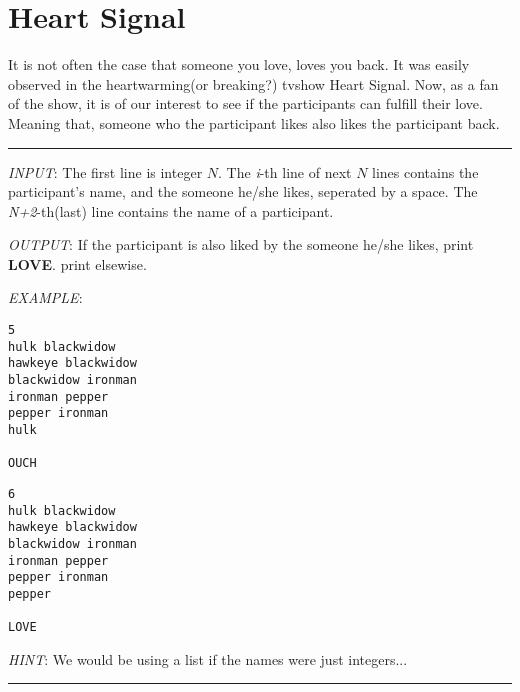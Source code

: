 \documentclass{article}
\begin{document}
\section{Heart Signal}
It is not often the case that someone you love, loves you back. It was easily
observed in the heartwarming(or breaking?) tvshow Heart Signal. Now, as a fan
of the show, it is of our interest to see if the participants can fulfill their love.
Meaning that, someone who the participant likes also likes the participant
back.\\
\noindent\rule{\textwidth}{0.9pt}
\textit{INPUT}: The first line is integer $N$. The \textit{i}-th line of next
$N$ lines contains the participant's name, and the someone he/she likes,
seperated by a space. The \textit{N+2}-th(last) line contains the name of a
participant. 

\textit{OUTPUT}: If the participant is also liked by the someone he/she likes,
print \textbf{LOVE}. print  elsewise.

\textit{EXAMPLE}:
\begin{lstlisting}
5
hulk blackwidow
hawkeye blackwidow
blackwidow ironman
ironman pepper
pepper ironman
hulk

OUCH
\end{lstlisting}

\begin{lstlisting}
6
hulk blackwidow
hawkeye blackwidow
blackwidow ironman
ironman pepper
pepper ironman
pepper

LOVE
\end{lstlisting}
\textit{HINT}: We would be using a list if the names were just integers...
\noindent\rule{\textwidth}{0.9pt}
\end{document}
